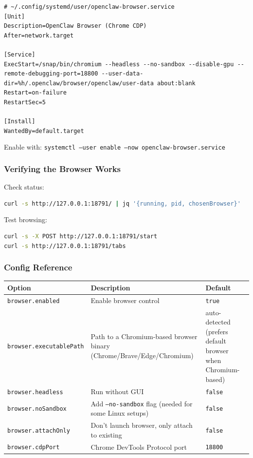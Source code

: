 \begin{lstlisting}
# ~/.config/systemd/user/openclaw-browser.service
[Unit]
Description=OpenClaw Browser (Chrome CDP)
After=network.target

[Service]
ExecStart=/snap/bin/chromium --headless --no-sandbox --disable-gpu --remote-debugging-port=18800 --user-data-dir=%h/.openclaw/browser/openclaw/user-data about:blank
Restart=on-failure
RestartSec=5

[Install]
WantedBy=default.target
\end{lstlisting}


Enable with: \texttt{systemctl --user enable --now openclaw-browser.service}

\subsubsection{Verifying the Browser Works}


Check status:

\begin{lstlisting}[language=bash]
curl -s http://127.0.0.1:18791/ | jq '{running, pid, chosenBrowser}'
\end{lstlisting}


Test browsing:

\begin{lstlisting}[language=bash]
curl -s -X POST http://127.0.0.1:18791/start
curl -s http://127.0.0.1:18791/tabs
\end{lstlisting}


\subsubsection{Config Reference}



\begin{table}[h]
\centering
\small
\begin{tabular}{|l|l|l|}
\hline
Option & Description & Default \\
\hline
\texttt{browser.enabled} & Enable browser control & \texttt{true} \\
\hline
\texttt{browser.executablePath} & Path to a Chromium-based browser binary (Chrome/Brave/Edge/Chromium) & auto-detected (prefers default browser when Chromium-based) \\
\hline
\texttt{browser.headless} & Run without GUI & \texttt{false} \\
\hline
\texttt{browser.noSandbox} & Add \texttt{--no-sandbox} flag (needed for some Linux setups) & \texttt{false} \\
\hline
\texttt{browser.attachOnly} & Don't launch browser, only attach to existing & \texttt{false} \\
\hline
\texttt{browser.cdpPort} & Chrome DevTools Protocol port & \texttt{18800} \\
\hline
\end{tabular}
\end{table}




